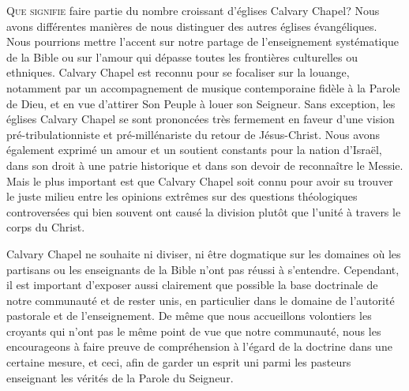 
\lettrine{Q}{ue signifie} faire partie du nombre \pocketlinebreak
 croissant d'églises Calvary Chapel?
 Nous avons différentes manières de nous distinguer des autres églises évangéliques.
 Nous pourrions mettre l'accent sur notre partage de l'enseignement systématique \pocketlinebreak
 de la Bible
 ou sur l'amour qui dépasse tou\-tes les frontières culturelles ou ethniques.
Calvary Chapel est reconnu pour se focaliser sur la louange,
 notamment par un
 accompagnement de musique con\-tem\-po\-rai\-ne fidèle à la Parole de Dieu,
 et en vue d'attirer Son Peuple à louer son Seigneur.
 Sans exception, les églises Calvary Chapel se sont prononcées très fermement
 en faveur d'une vision pré-tribulationniste et pré-millénariste du retour de Jésus-Christ.
Nous avons également exprimé un amour et un soutient constants pour la nation
 d'Israël,
 dans son droit à une patrie historique  et dans son devoir de reconnaître le Messie.
 Mais le plus important est que Calvary Chapel soit connu pour avoir su trouver
 le juste milieu entre les opinions extrêmes sur des questions théologiques
 controversées qui bien souvent ont causé la division plutôt que l'unité
 à travers le corps du Christ.

Calvary Chapel ne souhaite ni diviser, ni être dogmatique sur les domaines où les partisans
 ou les enseignants de la Bible n'ont pas réussi à s'entendre.
 Cependant, il est important d'exposer aussi clairement que possible la base doctrinale
 de notre communauté et de rester unis, en particulier dans le domaine de l'autorité pastorale
 et de l'enseignement. De même que nous accueillons volontiers les croyants qui
 n'ont pas
 le même point de vue que notre communauté, nous les encourageons à 
 faire preuve de compréhension
 à l'égard de la doctrine dans une certaine mesure, et ceci, afin de garder un esprit uni
 parmi les pasteurs enseignant les vérités de la Parole du Seigneur.

